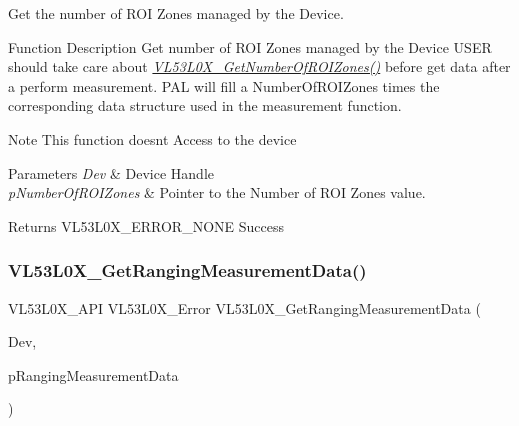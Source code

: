 Get the number of R\+OI Zones managed by the Device. 

\begin{DoxyParagraph}{Function Description}
Get number of R\+OI Zones managed by the Device U\+S\+ER should take care about {\itshape \hyperlink{group__VL53L0X__measurement__group_gad345958f05c6b130f35c569dd0d0e4f8}{V\+L53\+L0\+X\+\_\+\+Get\+Number\+Of\+R\+O\+I\+Zones()}} before get data after a perform measurement. P\+AL will fill a Number\+Of\+R\+O\+I\+Zones times the corresponding data structure used in the measurement function.
\end{DoxyParagraph}
\begin{DoxyNote}{Note}
This function doesn\textquotesingle{}t Access to the device
\end{DoxyNote}

\begin{DoxyParams}{Parameters}
{\em Dev} & Device Handle \\
\hline
{\em p\+Number\+Of\+R\+O\+I\+Zones} & Pointer to the Number of R\+OI Zones value. \\
\hline
\end{DoxyParams}
\begin{DoxyReturn}{Returns}
V\+L53\+L0\+X\+\_\+\+E\+R\+R\+O\+R\+\_\+\+N\+O\+NE Success 
\end{DoxyReturn}
\mbox{\label{group__VL53L0X__measurement__group_ga2ed3769943964e7c24f3c8a06ef14ad7}} 
\subsubsection{\texorpdfstring{V\+L53\+L0\+X\+\_\+\+Get\+Ranging\+Measurement\+Data()}{VL53L0X\_GetRangingMeasurementData()}}
{\footnotesize\ttfamily V\+L53\+L0\+X\+\_\+\+A\+PI V\+L53\+L0\+X\+\_\+\+Error V\+L53\+L0\+X\+\_\+\+Get\+Ranging\+Measurement\+Data (\begin{DoxyParamCaption}\item[{\hyperlink{group__VL53L0X__platform__group_ga2d6405308b1dd524b462f1b8fb97d167}{V\+L53\+L0\+X\+\_\+\+D\+EV}}]{Dev,  }\item[{\hyperlink{structVL53L0X__RangingMeasurementData__t}{V\+L53\+L0\+X\+\_\+\+Ranging\+Measurement\+Data\+\_\+t} $\ast$}]{p\+Ranging\+Measurement\+Data }\end{DoxyParamCaption})}



